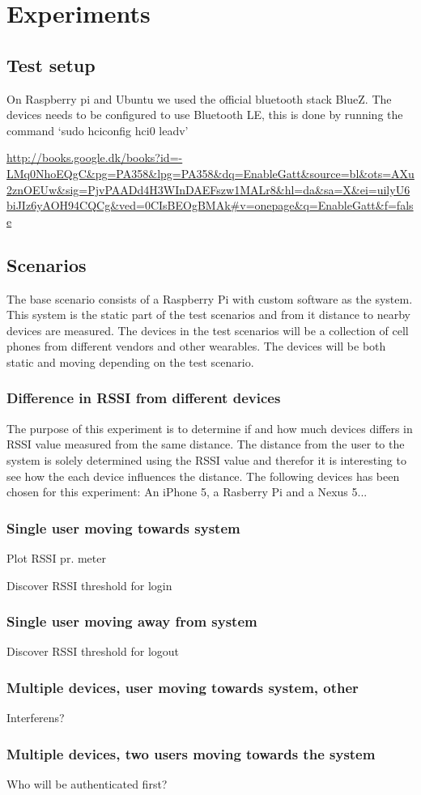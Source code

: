 \section{Experiments}

\subsection{Test setup}

On Raspberry pi and Ubuntu we used the official bluetooth stack BlueZ.
The devices needs to be configured to use Bluetooth LE, this is done by running the command ‘sudo hciconfig hci0 leadv’

\url{http://books.google.dk/books?id=-LMq0NhoEQgC&pg=PA358&lpg=PA358&dq=EnableGatt&source=bl&ots=AXu2znOEUw&sig=PjvPAADd4H3WInDAEFszw1MALr8&hl=da&sa=X&ei=uilyU6biJIz6yAOH94CQCg&ved=0CIsBEOgBMAk#v=onepage&q=EnableGatt&f=false}

\subsection{Scenarios}

The base scenario consists of a Raspberry Pi with custom software as the system.
This system is the static part of the test scenarios and from it distance to nearby devices are measured.
The devices in the test scenarios will be a collection of cell phones from different vendors and other wearables.
The devices will be both static and moving depending on the test scenario.


\subsubsection{Difference in RSSI from different devices}
The purpose of this experiment is to determine if and how much devices differs in RSSI value measured from the same distance. The distance from the user to the system is solely determined using the RSSI value and therefor it is interesting to see how the each device influences the distance.
	The following devices has been chosen for this experiment: An iPhone 5, a Rasberry Pi and a Nexus 5... 

\subsubsection{Single user moving towards system}
Plot RSSI pr. meter

Discover RSSI threshold for login

\subsubsection{Single user moving away from system}
Discover RSSI threshold for logout

\subsubsection{Multiple devices, user moving towards system, other}
Interferens?

\subsubsection{Multiple devices, two users moving towards the system}
Who will be authenticated first?
